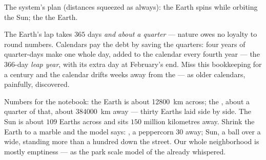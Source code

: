 \begin{omfigure}

{\small The system's plan (distances squeezed as always): the
Earth spins while orbiting the Sun; the   the Earth.}
\end{omfigure}

\begin{example}\label{ex:g6:sun-earth-moon:leap}
The Earth's lap takes $365$ days \emph{and about a quarter} ---
nature owes no loyalty to round numbers. Calendars pay the debt by
saving the quarters: four years of quarter-days make one whole
day, added to the calendar every fourth year --- the $366$-day
\emph{leap year}, with its extra day at February's end. Miss this
bookkeeping for a century and the calendar drifts weeks away from
the  --- as older calendars, painfully, discovered.
\end{example}

\begin{example}\label{ex:g6:sun-earth-moon:scale}
Numbers for the notebook: the Earth is about \qty{12800}{km}
across; the , about a quarter of that,  about
\qty{384000}{km} away --- thirty Earths laid side by side. The
Sun is about $109$ Earths across and sits $150$ million
kilometres away. Shrink the Earth to a  marble and the
model says: , a peppercorn $30$  away; Sun, a ball
over a  wide, standing more than a hundred  down the
street. Our whole neighborhood is mostly emptiness --- as the park
scale model of the  already whispered.
\end{example}

